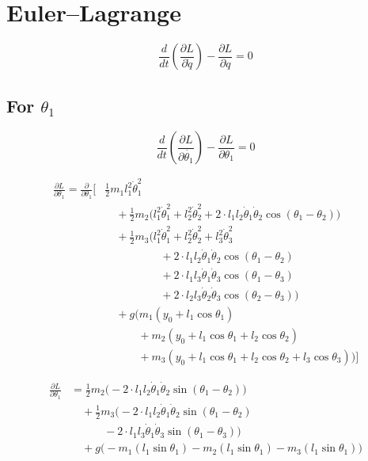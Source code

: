 \documentclass[11pt,a4paper]{article}
\begin{document}
\section{Euler--Lagrange}

\[ \frac{d}{dt} \left( \frac{\partial L}{\partial \dot{q}} \right) - \frac{\partial L}{\partial q} = 0 \]

\subsection{For $\theta_1$}

\[ \frac{d}{dt} \left( \frac{\partial L}{\partial \dot{\theta_1}} \right) - \frac{\partial L}{\partial \theta_1} = 0 \]

\begin{align*}
    \frac{\partial L}{\partial \theta_1} = \frac{\partial}{\partial \theta_1} \Biggl[
    &\frac{1}{2} m_1 l_1^2 \dot{\theta}_1^2 \\
    &\quad + \frac{1}{2} m_2 \big( l_1^2 \dot{\theta}_1^2 + l_2^2 \dot{\theta}_2^2 + 2 \cdot l_1 l_2 \dot{\theta}_1 \dot{\theta}_2 \cos(\theta_1 - \theta_2) \big) \\
    &\quad + \frac{1}{2} m_3 \big( l_1^2 \dot{\theta}_1^2 + l_2^2 \dot{\theta}_2^2 + l_3^2 \dot{\theta}_3^2 \\
        &\qquad\qquad\quad + 2 \cdot l_1 l_2 \dot{\theta}_1 \dot{\theta}_2 \cos(\theta_1 - \theta_2) \\
        &\qquad\qquad\quad + 2 \cdot l_1 l_3 \dot{\theta}_1 \dot{\theta}_3 \cos(\theta_1 - \theta_3) \\
        &\qquad\qquad\quad + 2 \cdot l_2 l_3 \dot{\theta}_2 \dot{\theta}_3 \cos(\theta_2 - \theta_3) \big) \\
    &\quad + g \big( m_1 (y_0 + l_1 \cos\theta_1) \\
        &\qquad\quad + m_2 (y_0 + l_1 \cos\theta_1 + l_2 \cos\theta_2) \\
        &\qquad\quad + m_3 (y_0 + l_1 \cos\theta_1 + l_2 \cos\theta_2 + l_3 \cos\theta_3) \big) \Biggr]
\end{align*}

\begin{align*}
    \frac{\partial L}{\partial \theta_1} &= \frac{1}{2} m_2 \big(-2 \cdot l_1 l_2 \dot{\theta}_1 \dot{\theta}_2 \sin(\theta_1 - \theta_2) \big)\\
    &\quad + \frac{1}{2} m_3 \big( -2 \cdot l_1 l_2 \dot{\theta}_1 \dot{\theta}_2 \sin(\theta_1 - \theta_2) \\
        &\qquad\quad - 2 \cdot l_1 l_3 \dot{\theta}_1 \dot{\theta}_3 \sin(\theta_1 - \theta_3) \big) \\
    &\quad + g \big(- m_1 (l_1 \sin\theta_1) - m_2 (l_1 \sin\theta_1) - m_3 (l_1 \sin\theta_1) \big)
\end{align*}
\end{document}
